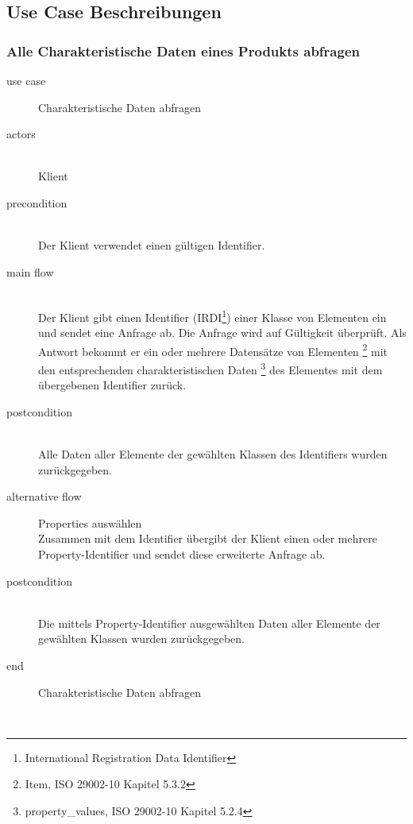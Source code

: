 
\subsection{Use Case Beschreibungen}

\subsubsection{Alle Charakteristische Daten eines Produkts abfragen}

{\small

\begin{description}
     \item[use case] Charakteristische Daten abfragen
     \item[  actors]~\\
     Klient
     \item[  precondition]~\\
     Der Klient verwendet einen gültigen Identifier.
     \item[  main flow]~\\
     Der Klient gibt einen Identifier (IRDI\footnote{International Registration Data Identifier}) einer Klasse von Elementen ein und sendet eine Anfrage ab. Die Anfrage wird auf Gültigkeit überprüft. Als Antwort bekommt er ein oder mehrere Datensätze von Elementen \footnote{Item, ISO 29002-10 Kapitel 5.3.2} mit den entsprechenden charakteristischen Daten \footnote{property\_values, ISO 29002-10 Kapitel 5.2.4}  des Elementes mit dem übergebenen Identifier zurück.
     \item[  postcondition]~\\
     Alle Daten aller Elemente der gewählten Klassen des Identifiers wurden zurückgegeben.    
     \item[  alternative flow] Properties auswählen ~\\
     Zusammen mit dem Identifier übergibt der Klient einen oder mehrere Property-Identifier und sendet diese erweiterte Anfrage ab.    
     \item[  postcondition]~\\
     Die mittels Property-Identifier ausgewählten Daten aller Elemente der gewählten Klassen wurden zurückgegeben.    
     \item[end] Charakteristische Daten abfragen
\end{description}

~\\

} %

